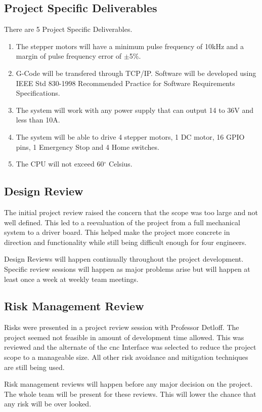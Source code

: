 \subsection{Project Specific Deliverables}
There are 5 Project Specific Deliverables.
	\begin{enumerate}
		\item  The stepper motors will have a minimum pulse frequency of 10kHz and a margin of pulse frequency error of  $\pm $5\%.
		\item G-Code will be transfered through TCP/IP.
Software will be developed using IEEE Std 830-1998 Recommended Practice for Software Requirements Specifications.
		\item The system will work with any power supply that can output 14 to 36V and less than 10A.
		\item The system will be able to drive 4 stepper motors, 1 DC motor, 16 GPIO pins, 1 Emergency Stop and 4 Home switches.
		\item The CPU will not exceed 60$^\circ$ Celsius. 
	\end{enumerate}
\subsection{Design Review}
The initial project review raised the concern that the scope was too large and not well defined.
This led to a reevaluation of the project from a full mechanical system to a driver board.
This helped make the project more concrete in direction and functionality while still being difficult enough for four engineers.

Design Reviews will happen continually throughout the project development. 
Specific review sessions will happen as major problems arise but will happen at least once a week at weekly team meetings.
\subsection{Risk Management Review}
Risks were presented in a project review session with Professor Detloff.
The project seemed not feasible in amount of development time allowed.
This was reviewed and the alternate of the \gls{cnc} Interface was selected to reduce the project scope to a manageable size. 
All other risk avoidance and mitigation techniques are still being used.   

Risk management reviews will happen before any major decision on the project.
The whole team will be present for these reviews. 
This will lower the chance that any risk will be over looked.

